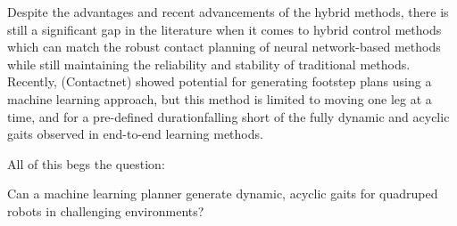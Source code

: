 Despite the advantages and recent advancements of the hybrid methods,
there is still a significant gap in the literature when it comes to
hybrid control methods which can match the robust contact planning
of neural network-based methods while still maintaining the
reliability and stability of traditional methods. Recently, (Contactnet)
showed potential for generating footstep plans using a machine learning
approach, but this method is limited to moving one leg at a time, and
for a pre-defined duration\textemdash falling short of the fully
dynamic and acyclic gaits observed in end-to-end learning methods.

All of this begs the question:

\begin{emphasis}
  Can a machine learning planner generate dynamic, acyclic gaits for
  quadruped robots in challenging environments?
\end{emphasis}
